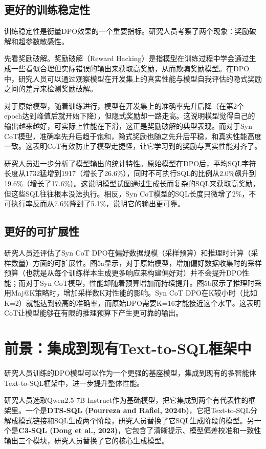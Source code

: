 \subsection{更好的训练稳定性}
训练稳定性是衡量DPO效果的一个重要指标。研究人员考察了两个现象：奖励破解和超参数敏感性。

先看奖励破解。奖励破解（Reward Hacking）是指模型在训练过程中学会通过生成一些看似合理但实际错误的输出来获取高奖励，从而欺骗奖励模型。在DPO中，研究人员可以通过观察模型在开发集上的真实性能与模型自我评估的隐式奖励之间的差异来检测奖励破解。

对于原始模型，随着训练进行，模型在开发集上的准确率先升后降（在第2个epoch达到峰值后就开始下降），但隐式奖励却一路走高。这说明模型觉得自己的输出越来越好，可实际上性能在下滑，这正是奖励破解的典型表现。而对于Syn CoT模型，准确率先升后趋于饱和，隐式奖励也随之先升后平稳，和真实性能高度一致。这表明CoT有效防止了模型走捷径，让它学习到的奖励与真实性能对齐了。

研究人员进一步分析了模型输出的统计特性。原始模型在DPO后，平均SQL字符长度从1732猛增到1917（增长了26.6\%），同时不可执行SQL的比例从2.0\%飙升到19.6\%（增长了17.6\%）。这说明模型试图通过生成长而复杂的SQL来获取高奖励，但这些SQL往往根本没法执行。相反，Syn CoT模型的SQL长度只微增了2\%，不可执行率反而从7.6\%降到了5.1\%，说明它的输出更可靠。

\subsection{更好的可扩展性}
研究人员还评估了Syn CoT DPO在偏好数据规模（采样预算）和推理时计算（采样数量）方面的可扩展性。图5a显示，对于原始模型，增加偏好数据收集时的采样预算（也就是从每个训练样本生成更多响应来构建偏好对）并不会提升DPO性能；而对于Syn CoT模型，性能却随着预算增加而持续提升。图5b展示了推理时采用Maj@K策略时，增加采样数K对性能的影响。Syn CoT DPO在K较小时（比如K=2）就能达到较高的准确率，而原始DPO需要K=16才能接近这个水平。这表明CoT让模型能够在有限的推理预算下产生更可靠的输出。

\section{前景：集成到现有Text-to-SQL框架中}
研究人员训练的DPO模型可以作为一个更强的基座模型，集成到现有的多智能体Text-to-SQL框架中，进一步提升整体性能。

研究人员选取Qwen2.5-7B-Instruct作为基础模型，把它集成到两个有代表性的框架里。一个是\textbf{DTS-SQL (Pourreza and Rafiei, 2024b)}，它把Text-to-SQL分解成模式链接和SQL生成两个阶段，研究人员替换了它SQL生成阶段的模型。另一个是\textbf{C3-SQL (Dong et al., 2023)}，它包含了清晰提示、模型偏差校准和一致性输出三个模块，研究人员替换了它的核心生成模型。

